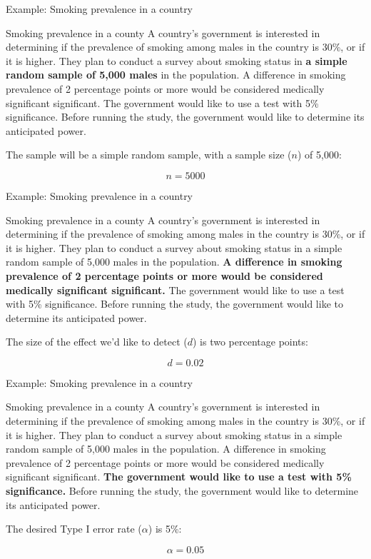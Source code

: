 \documentclass[ignorenonframetext,]{beamer}
\begin{document}
\begin{frame}{Example: Smoking prevalence in a country}

\begin{block}{Smoking prevalence in a county}
A country's government is interested in determining if the prevalence of smoking among males in the country is 30\%, or if it is higher. They plan to conduct a survey about smoking status in \textbf{a simple random sample of 5,000 males} in the population. A difference in smoking prevalence of 2 percentage points or more would be considered medically significant significant. The government would like to use a test with 5\% significance. Before running the study, the government would like to determine its anticipated power.
\end{block}

The sample will be a simple random sample, with a sample size (\(n\)) of
5,000:

\[
n = 5000
\]

\end{frame}

\begin{frame}{Example: Smoking prevalence in a country}

\begin{block}{Smoking prevalence in a county}
A country's government is interested in determining if the prevalence of smoking among males in the country is 30\%, or if it is higher. They plan to conduct a survey about smoking status in a simple random sample of 5,000 males in the population. \textbf{A difference in smoking prevalence of 2 percentage points or more would be considered medically significant significant.} The government would like to use a test with 5\% significance. Before running the study, the government would like to determine its anticipated power.
\end{block}

The size of the effect we'd like to detect (\(d\)) is two percentage
points:

\[
d = 0.02
\]

\end{frame}

\begin{frame}{Example: Smoking prevalence in a country}

\begin{block}{Smoking prevalence in a county}
A country's government is interested in determining if the prevalence of smoking among males in the country is 30\%, or if it is higher. They plan to conduct a survey about smoking status in a simple random sample of 5,000 males in the population. A difference in smoking prevalence of 2 percentage points or more would be considered medically significant significant. \textbf{The government would like to use a test with 5\% significance.} Before running the study, the government would like to determine its anticipated power.
\end{block}

The desired Type I error rate (\(\alpha\)) is 5\%:

\[
\alpha = 0.05
\]

\end{frame}
\end{document}
